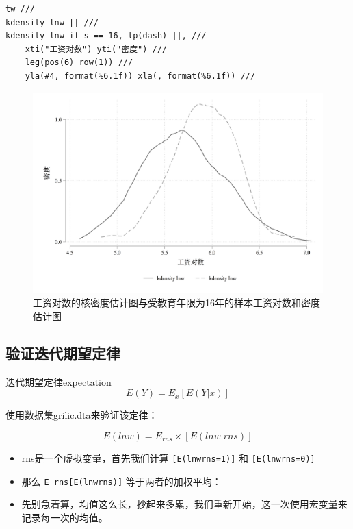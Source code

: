 \begin{lstlisting}
tw ///
kdensity lnw || ///
kdensity lnw if s == 16, lp(dash) ||, ///
    xti("工资对数") yti("密度") ///
    leg(pos(6) row(1)) ///
    yla(#4, format(%6.1f)) xla(, format(%6.1f)) ///
\end{lstlisting}

\begin{figure}[htbp]
  \centering \includegraphics[width=\textwidth]{assets/kdensity2.png}
  \caption{工资对数的核密度估计图与受教育年限为16年的样本工资对数和密度估计图}
  \label{fig:kden2}
\end{figure}

\subsection{验证迭代期望定律}

\begin{definition}{迭代期望定律}{expectation}
  \begin{equation}
    E(Y) = E_x[E(Y|x)]
  \end{equation}
\end{definition}

使用数据集grilic.dta来验证该定律：

\[E(lnw) = E_{rns} \times [E(lnw|rns)]\]

\begin{itemize}
\item  rns是一个虚拟变量，首先我们计算 \texttt{{[}E(lnw\textbar{}rns=1){]}} 和 \texttt{{[}E(lnw\textbar{}rns=0){]}}
\item  那么 \texttt{E\_rns{[}E(lnw\textbar{}rns){]}} 等于两者的加权平均：
\item  先别急着算，均值这么长，抄起来多累，我们重新开始，这一次使用宏变量来记录每一次的均值。
\end{itemize}

